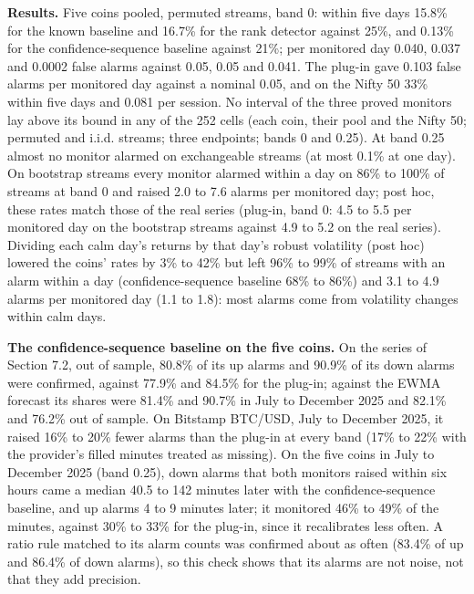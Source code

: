 \documentclass[
]{article}
\begin{document}
\textbf{Results.} Five coins pooled, permuted streams, band 0: within
five days 15.8\% for the known baseline and 16.7\% for the rank detector
against 25\%, and 0.13\% for the confidence-sequence baseline against
21\%; per monitored day 0.040, 0.037 and 0.0002 false alarms against
0.05, 0.05 and 0.041. The plug-in gave 0.103 false alarms per monitored
day against a nominal 0.05, and on the Nifty 50 33\% within five days
and 0.081 per session. No interval of the three proved monitors lay
above its bound in any of the 252 cells (each coin, their pool and the
Nifty 50; permuted and i.i.d. streams; three endpoints; bands 0 and
0.25). At band 0.25 almost no monitor alarmed on exchangeable streams
(at most 0.1\% at one day). On bootstrap streams every monitor alarmed
within a day on 86\% to 100\% of streams at band 0 and raised 2.0 to 7.6
alarms per monitored day; post hoc, these rates match those of the real
series (plug-in, band 0: 4.5 to 5.5 per monitored day on the bootstrap
streams against 4.9 to 5.2 on the real series). Dividing each calm day's
returns by that day's robust volatility (post hoc) lowered the coins'
rates by 3\% to 42\% but left 96\% to 99\% of streams with an alarm
within a day (confidence-sequence baseline 68\% to 86\%) and 3.1 to 4.9
alarms per monitored day (1.1 to 1.8): most alarms come from volatility
changes within calm days.

\textbf{The confidence-sequence baseline on the five coins.} On the
series of Section 7.2, out of sample, 80.8\% of its up alarms and 90.9\%
of its down alarms were confirmed, against 77.9\% and 84.5\% for the
plug-in; against the EWMA forecast its shares were 81.4\% and 90.7\% in
July to December 2025 and 82.1\% and 76.2\% out of sample. On Bitstamp
BTC/USD, July to December 2025, it raised 16\% to 20\% fewer alarms than
the plug-in at every band (17\% to 22\% with the provider's filled
minutes treated as missing). On the five coins in July to December 2025
(band 0.25), down alarms that both monitors raised within six hours came
a median 40.5 to 142 minutes later with the confidence-sequence
baseline, and up alarms 4 to 9 minutes later; it monitored 46\% to 49\%
of the minutes, against 30\% to 33\% for the plug-in, since it
recalibrates less often. A ratio rule matched to its alarm counts was
confirmed about as often (83.4\% of up and 86.4\% of down alarms), so
this check shows that its alarms are not noise, not that they add
precision.
\end{document}
